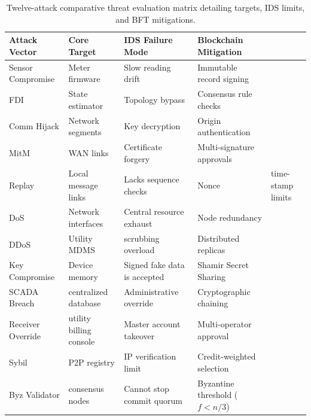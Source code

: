 \documentclass[12pt, oneside, a4paper]{report}
\theoremstyle{definition}
\theoremstyle{remark}
\begin{document}
\begin{table}[htbp]
\centering
\small
\renewcommand{\arraystretch}{1.3}
\begin{tabularx}{\textwidth}{lXll}
\toprule
\textbf{Attack Vector} & \textbf{Core Target} & \textbf{IDS Failure Mode} & \textbf{Blockchain Mitigation} \\
\midrule
Sensor Compromise & Meter firmware & Slow reading drift & Immutable record signing \\
FDI & State estimator & Topology bypass & Consensus rule checks \\
Comm Hijack & Network segments & Key decryption & Origin authentication \\
MitM & WAN links & Certificate forgery & Multi-signature approvals \\
Replay & Local message links & Lacks sequence checks & Nonce & time-stamp limits \\
DoS & Network interfaces & Central resource exhaust & Node redundancy \\
DDoS & Utility MDMS & scrubbing overload & Distributed replicas \\
Key Compromise & Device memory & Signed fake data is accepted & Shamir Secret Sharing \\
SCADA Breach & centralized database & Administrative override & Cryptographic chaining \\
Receiver Override & utility billing console & Master account takeover & Multi-operator approval \\
Sybil & P2P registry & IP verification limit & Credit-weighted selection \\
Byz Validator & consensus nodes & Cannot stop commit quorum & Byzantine threshold ($f < n/3$) \\
\bottomrule
\end{tabularx}
\caption{Twelve-attack comparative threat evaluation matrix detailing targets, IDS limits, and BFT mitigations.}
\label{tab:attack_comparison_matrix}
\end{table}


\cleardoublepage


﻿%
\end{document}
